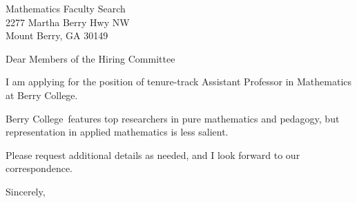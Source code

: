 




	
	
	\def\School{Berry College}
	
	\begin{letter}
		{Mathematics Faculty Search\\
			2277 Martha Berry Hwy NW\\
			Mount Berry, GA 30149
		}
		
		\opening{Dear Members of the Hiring Committee}
		
		
		I am applying for the position of tenure-track Assistant Professor in Mathematics at \School. 
		
		
		
		\School~features top researchers in pure mathematics and pedagogy, but representation in applied mathematics is less salient. 
		
		
		
		
		
		Please request additional details as needed, and I look forward to our correspondence.
		
		\closing{Sincerely,}
	\end{letter}
